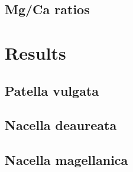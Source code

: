 \documentclass[
  authoryear,
  preprint,
  3p]{elsarticle}
\begin{document}
\subsection{Mg/Ca ratios}\label{mgca-ratios}

\section{Results}\label{Results}

\subsection{Patella vulgata}\label{patella-vulgata}

\subsection{Nacella deaureata}\label{nacella-deaureata}

\subsection{Nacella magellanica}\label{nacella-magellanica}

\section{}\label{section}
\end{document}

